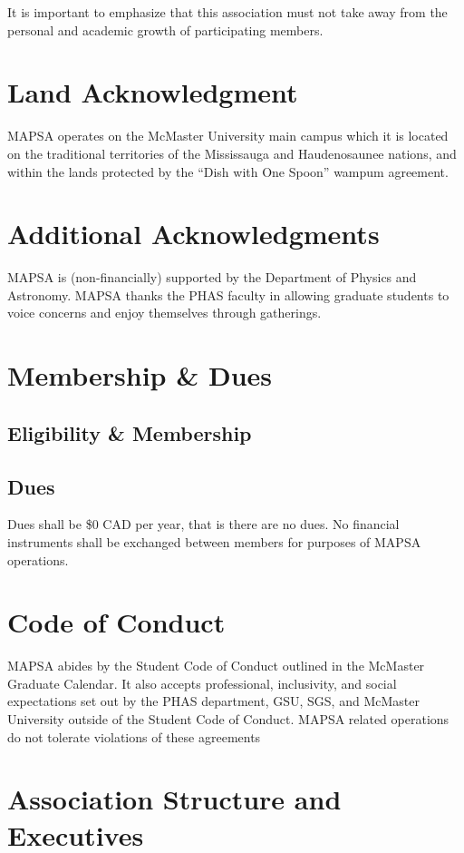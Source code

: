 \documentclass[onecolumn,aps,prd]{revtex4-2}
\begin{document}
It is important to emphasize that this association must not take away from the personal and academic growth of participating members.

\section{Land Acknowledgment}
MAPSA operates on the McMaster University main campus which it is located on the traditional territories of the Mississauga and Haudenosaunee nations, and within the lands protected by the ``Dish with One Spoon'' wampum agreement.

\section{Additional Acknowledgments}
MAPSA is (non-financially) supported by the Department of Physics and Astronomy. MAPSA thanks the PHAS faculty in allowing graduate students to voice concerns and enjoy themselves through gatherings.

\section{Membership \& Dues}
\subsection{Eligibility \& Membership}
\subsection{Dues}
Dues shall be \$0 CAD per year, that is there are no dues. No financial instruments shall be exchanged between members for purposes of MAPSA operations.

\section{Code of Conduct}
MAPSA abides by the Student Code of Conduct outlined in the McMaster Graduate Calendar. It also accepts professional, inclusivity, and social expectations set out by the PHAS department, GSU, SGS, and McMaster University outside of the Student Code of Conduct. MAPSA related operations do not tolerate violations of these agreements

\section{Association Structure and Executives}
\end{document}
